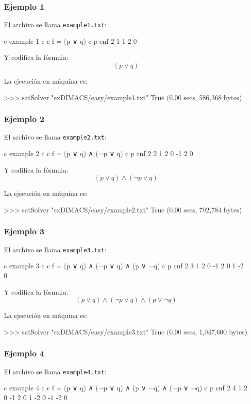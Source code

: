 \subsubsection{Ejemplo 1}

El archivo se llama \texttt{example1.txt}:
\begin{codigo}
c example 1 
c 
c f = (p ∨ q)
c
p cnf 2 1 
1 2 0
\end{codigo}

Y codifica la fórmula:
$$(p \vee q)$$

La ejecución en máquina es:
\begin{code}
>>> satSolver "exDIMACS/easy/example1.txt"
True
(0.00 secs, 586,368 bytes)
\end{code}
\subsubsection{Ejemplo 2}
El archivo se llama \texttt{example2.txt}:
\begin{codigo}
c example 2
c 
c f = (p ∨ q) ∧ (¬p ∨ q)
c
p cnf 2 2
1 2 0
-1 2 0
\end{codigo}

Y codifica la fórmula:
$$(p \vee q) \wedge (\neg p \vee q)$$

La ejecución en máquina es:
\begin{code}
>>> satSolver "exDIMACS/easy/example2.txt"
True
(0.00 secs, 792,784 bytes)
\end{code}
\subsubsection{Ejemplo 3}
El archivo se llama \texttt{example3.txt}:
\begin{codigo}
c example 3
c 
c f = (p ∨ q) ∧ (¬p ∨ q) ∧ (p ∨ ¬q)
c
p cnf 2 3
1 2 0
-1 2 0
1 -2 0
\end{codigo}

Y codifica la fórmula:
$$(p \vee q)\wedge (\neg p \vee q)\wedge ( p \vee \neg q)$$

La ejecución en máquina es:
\begin{code}
>>> satSolver "exDIMACS/easy/example3.txt"
True
(0.00 secs, 1,047,600 bytes)
\end{code}
\subsubsection{Ejemplo 4}
El archivo se llama \texttt{example4.txt}:
\begin{codigo}
c example 4
c 
c f = (p ∨ q) ∧ (¬p ∨ q) ∧ (p ∨ ¬q) ∧ (¬p ∨ ¬q)
c
p cnf 2 4
1 2 0
-1 2 0
1 -2 0
-1 -2 0
\end{codigo}


